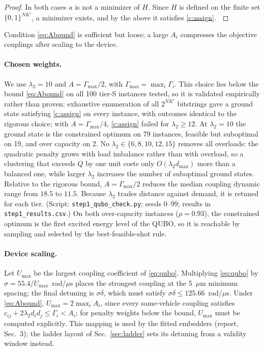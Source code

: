\documentclass[10pt]{article}
\begin{document}
\begin{proof}
In both cases $a$ is not a minimizer of $H$. Since $H$ is defined on the finite set $\{0,1\}^{NK'}$, a
minimizer exists, and by the above it satisfies \eqref{c:assign}. $\qedhere$
\end{proof}
 
Condition \eqref{eq:Abound} is sufficient but loose; a large $A_i$ compresses the objective couplings after scaling to the device.

\paragraph{Chosen weights.} We use $\lambda_2=10$ and $A=\Gamma_{\max}/2$, with $\Gamma_{\max}=\max_i\Gamma_i$. This
choice lies below the bound \eqref{eq:Abound} on all 100 tier-S instances tested, so it is validated empirically
rather than proven: exhaustive enumeration of all $2^{NK'}$ bitstrings gave a ground state satisfying
\eqref{c:assign} on every instance, with outcomes identical to the rigorous choice; with $A=\Gamma_{\max}/4$,
\eqref{c:assign} failed for $\lambda_2\ge12$. At $\lambda_2=10$ the ground state is the constrained optimum on 79
instances, feasible but suboptimal on 19, and over capacity on 2. No $\lambda_2\in\{6,8,10,12,15\}$ removes all
overloads: the quadratic penalty grows with load imbalance rather than with overload, so a clustering that
exceeds $Q$ by one unit costs only $O(\lambda_2 d_{\max})$ more than a balanced one, while larger $\lambda_2$
increases the number of suboptimal ground states. Relative to the rigorous bound, $A=\Gamma_{\max}/2$ reduces the
median coupling dynamic range from $18.5$ to $11.5$. Because $\lambda_2$ trades distance against demand, it is
retuned for each tier. (Script: \texttt{step1\_qubo\_check.py}; seeds $0$--$99$; results in \texttt{step1\_results.csv}.)
On both over-capacity instances ($\rho=0.93$), the constrained optimum is the first excited energy level of the
QUBO, so it is reachable by sampling and selected by the best-feasible-shot rule.

\paragraph{Device scaling.} Let $U_{\max}$ be the largest coupling coefficient of \eqref{eq:qubo}. Multiplying
\eqref{eq:qubo} by $\sigma=55.4/U_{\max}$~rad/$\mu$s places the strongest coupling at the 5~$\mu$m minimum spacing;
the final detuning is $\sigma\delta$, which must satisfy $\sigma\delta\le125.66$~rad/$\mu$s. Under \eqref{eq:Abound},
$U_{\max}=2\max_iA_i$, since every same-vehicle coupling satisfies $c_{ij}+2\lambda_2d_id_j\le\Gamma_i<A_i$; for
penalty weights below the bound, $U_{\max}$ must be computed explicitly. This mapping is used by the
fitted embedders (report, Sec.~3); the ladder layout of Sec.~\ref{sec:ladder} sets its detuning from a validity
window instead.
\end{document}
